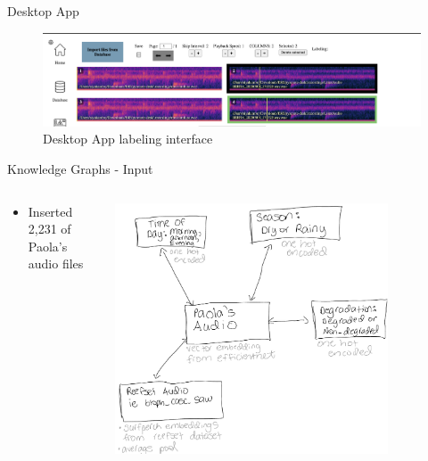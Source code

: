 \begin{frame}{Desktop App}
    \begin{figure}
        \centering
        \includegraphics[height=1.0\textheight,width=1.0\textwidth,keepaspectratio]{images/desktop_app_2.png}
        \caption{Desktop App labeling interface}
    \end{figure}
\end{frame}

\begin{frame}{Knowledge Graphs - Input}
    \begin{columns}
        \begin{column}{0.3\textwidth}
            \begin{itemize}
                \item Inserted 2,231 of Paola's audio files
            \end{itemize}
        \end{column}
        \begin{column}{0.7\textwidth}
            \centering
            \includegraphics[height=0.8\textheight,width=0.8\textwidth,keepaspectratio]{images/knowledge_graph.png}
        \end{column}
    \end{columns}
\end{frame}

